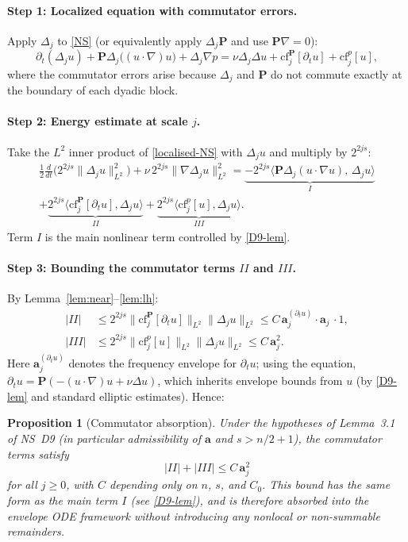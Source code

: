 \documentclass[11pt]{article}
\newtheorem{proposition}[lemma]{Proposition}
\theoremstyle{definition}
\newcommand{\PP}{\mathbf{P}}          %
\newcommand{\Dj}{\Delta_j}            %
\newcommand{\Lp}[1]{L^{#1}}
\newcommand{\norm}[1]{\lVert #1 \rVert}
\newcommand{\abs}[1]{\lvert #1 \rvert}
\newcommand{\la}{\langle}
\newcommand{\ra}{\rangle}
\newcommand{\cf}{\mathrm{cf}}         %
\newcommand{\env}{\mathbf{a}}         %
\begin{document}
\paragraph{Step 1: Localized equation with commutator errors.}
Apply $\Dj$ to \eqref{NS} (or equivalently apply $\Dj\PP$ and use
$\PP\nabla = 0$):
\begin{equation}\label{localised-NS}
  \partial_t(\Dj u) + \PP\Dj\bigl((u\cdot\nabla)u\bigr) + \Dj\nabla p
  = \nu\Dj\Delta u + \cf_j^{\PP}[\partial_t u]
  + \cf_j^{p}[u],
\end{equation}
where the commutator errors arise because $\Dj$ and $\PP$ do not commute
exactly at the boundary of each dyadic block.

\paragraph{Step 2: Energy estimate at scale $j$.}
Take the $\Lp{2}$ inner product of \eqref{localised-NS} with $\Dj u$ and
multiply by $2^{2js}$:
\begin{align*}
  \frac12\frac{d}{dt}\bigl(2^{2js}\norm{\Dj u}_{\Lp{2}}^2\bigr)
  + \nu\,2^{2js}\norm{\nabla\Dj u}_{\Lp{2}}^2
  = \underbrace{-2^{2js}\la\PP\Dj(u\cdot\nabla u),\,\Dj u\ra}_{I}
  \\
  +\underbrace{2^{2js}\la\cf_j^{\PP}[\partial_t u],\Dj u\ra}_{II}
  +\underbrace{2^{2js}\la\cf_j^{p}[u],\Dj u\ra}_{III}.
\end{align*}
Term $I$ is the main nonlinear term controlled by \eqref{D9-lem}.

\paragraph{Step 3: Bounding the commutator terms $II$ and $III$.}
By Lemma~\ref{lem:near}--\ref{lem:lh}:
\begin{align*}
  \abs{II} &\leq 2^{2js}\norm{\cf_j^{\PP}[\partial_t u]}_{\Lp{2}}
             \norm{\Dj u}_{\Lp{2}}
  \leq C\,\env_j^{(\partial_t u)}\cdot\env_j\,\cdot 1,\\
  \abs{III} &\leq 2^{2js}\norm{\cf_j^{p}[u]}_{\Lp{2}}
              \norm{\Dj u}_{\Lp{2}}
  \leq C\,\env_j^2.
\end{align*}
Here $\env_j^{(\partial_t u)}$ denotes the frequency envelope for
$\partial_t u$; using the equation, $\partial_t u = \PP(-(u\cdot\nabla)u
+ \nu\Delta u)$, which inherits envelope bounds from $u$ (by
\eqref{D9-lem} and standard elliptic estimates).  Hence:

\begin{proposition}[Commutator absorption]\label{prop:absorption}
Under the hypotheses of Lemma~3.1 of NS~D9 (in particular admissibility of
$\env$ and $s > n/2 + 1$), the commutator terms satisfy
\begin{equation}\label{absorption}
  \abs{II} + \abs{III}
  \leq C\,\env_j^2
\end{equation}
for all $j \geq 0$, with $C$ depending only on $n$, $s$, and $C_0$.
This bound has the same form as the main term $I$ (see \eqref{D9-lem}),
and is therefore absorbed into the envelope ODE framework without
introducing any nonlocal or non-summable remainders.
\end{proposition}
\end{document}
